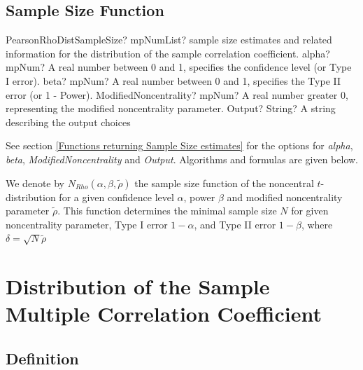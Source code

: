 \subsection{Sample Size Function}
\label{PearsonRhoDistributionSampleSize}

\begin{mpFunctionsExtract}
	\mpFunctionFourNotImplemented
	{PearsonRhoDistSampleSize? mpNumList? sample size estimates and related information for the distribution of the sample correlation coefficient.}
	{alpha? mpNum? A real number between 0 and 1, specifies the confidence level (or Type I error).}
	{beta? mpNum?  A real number between 0 and 1, specifies the Type II error (or 1 - Power).}
	{ModifiedNoncentrality? mpNum? A real number greater 0, representing the modified noncentrality parameter.}
	{Output? String? A string describing the output choices}
\end{mpFunctionsExtract}

\vspace{0.3cm}
See section \ref{Functions returning Sample Size estimates} for the options for  {\itshape\sffamily alpha}, {\itshape\sffamily beta}, {\itshape\sffamily ModifiedNoncentrality} and {\itshape\sffamily Output}. Algorithms and formulas are given below.

\vspace{0.3cm}
We denote by $N_{Rho}\left(\alpha, \beta, \widetilde{\rho} \right)$  the sample size function of the noncentral $t$-distribution for a given confidence level $\alpha$, power $\beta$ and modified noncentrality parameter $\widetilde{\rho}$. This function determines the minimal sample size $N$ for given noncentrality parameter, Type I error $1-\alpha$, and Type II error $1-\beta$, where  $\delta = \sqrt{N}\widetilde{\rho}$ 





\newpage
\section{Distribution of the Sample Multiple Correlation Coefficient}
\label{Rho2Distribution}



\subsection{Definition}
\label{Rho2DistributionDefinition}

